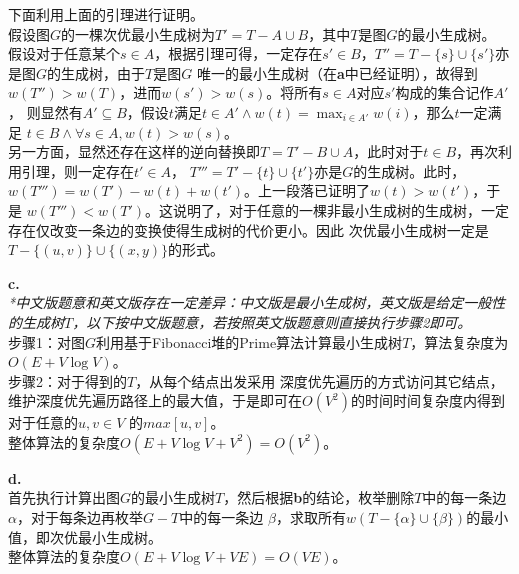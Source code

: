 \begin{solution}
    下面利用上面的引理进行证明。\\
    假设图$G$的一棵次优最小生成树为$T'=T-A\cup B$，其中$T$是图$G$的最小生成树。
    假设对于任意某个$s\in A$，根据引理可得，一定存在$s'\in B$，$T''=T-\{s\}\cup \{s'\}$亦是图$G$的生成树，由于$T$是图$G$
    唯一的最小生成树（在\textbf{a}中已经证明），故得到$w(T'')>w(T)$，进而$w(s')>w(s)$。将所有$s\in A$对应$s'$构成的集合记作$A'$，
    则显然有$A'\subseteq B$，假设$t$满足$t\in A' \wedge w(t) = \max_{i \in A'} w(i)$，那么$t$一定满足
    $t \in B \wedge \forall s \in A, w(t)>w(s)$。\\
    另一方面，显然还存在这样的逆向替换即$T=T'-B\cup A$，此时对于$t \in B$，再次利用引理，则一定存在$t' \in A$，
    $T'''=T'-\{t\}\cup \{t'\}$亦是$G$的生成树。此时，$w(T''') = w(T') - w(t) + w(t')$。上一段落已证明了$w(t)>w(t')$，于是
    $w(T''') < w(T')$。这说明了，对于任意的一棵非最小生成树的生成树，一定存在仅改变一条边的变换使得生成树的代价更小。因此
    次优最小生成树一定是$T-\{(u,v)\}\cup\{(x,y)\}$的形式。

    \textbf{c.}\\
    \textit{*中文版题意和英文版存在一定差异：中文版是最小生成树，英文版是给定一般性的生成树$T$，以下按中文版题意，若按照英文版题意则直接执行步骤2即可。}\\
    步骤1：对图$G$利用基于Fibonacci堆的Prime算法计算最小生成树$T$，算法复杂度为$O(E+V\log V)$。\\
    步骤2：对于得到的$T$，从每个结点出发采用
    深度优先遍历的方式访问其它结点，维护深度优先遍历路径上的最大值，于是即可在$O(V^2)$的时间时间复杂度内得到对于任意的$u,v \in V$
    的$max[u,v]$。\\
    整体算法的复杂度$O(E+V\log V+V^2) = O(V^2)$。

    \textbf{d.}\\
    首先执行计算出图$G$的最小生成树$T$，然后根据\textbf{b}的结论，枚举删除$T$中的每一条边$\alpha$，对于每条边再枚举$G-T$中的每一条边
    $\beta$，求取所有$w(T-\{\alpha\}\cup\{\beta\})$的最小值，即次优最小生成树。\\
    整体算法的复杂度$O(E+V\log V+VE) = O(VE)$。

\end{solution}
